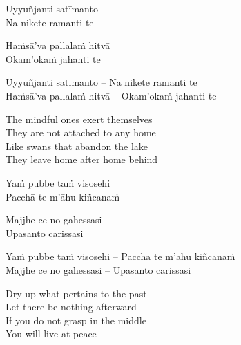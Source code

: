 \suttaRef{[Dhp 152]}

\ifninebythirteen

\clearpage

\begin{pali-hang-verses}
  Uyyuñjanti satīmanto\\
  Na nikete ramanti te
\end{pali-hang-verses}
\begin{pali-hang-together}
  Haṁsā'va pallalaṁ hitvā\\
  Okam'okaṁ jahanti te
\end{pali-hang-together}

\else

\begin{verses}
  Uyyuñjanti satīmanto – Na nikete ramanti te\\
  Haṁsā'va pallalaṁ hitvā – Okam'okaṁ jahanti te
\end{verses}

\fi

\begin{english-verses}
  The mindful ones exert themselves\\
  They are not attached to any home\\
  Like swans that abandon the lake\\
  They leave home after home behind
\end{english-verses}

\suttaRef{[Dhp 91]}

\ifbfive\clearpage\fi

\ifninebythirteen

\begin{pali-hang-verses}
  Yaṁ pubbe taṁ visosehi\\
  Pacchā te m'āhu kiñcanaṁ
\end{pali-hang-verses}
\begin{pali-hang-together}
  Majjhe ce no gahessasi\\
  Upasanto carissasi
\end{pali-hang-together}

\else

\begin{verses}
  Yaṁ pubbe taṁ visosehi – Pacchā te m'āhu kiñcanaṁ\\
  Majjhe ce no gahessasi – Upasanto carissasi
\end{verses}

\fi

\ifafive\clearpage\fi

\begin{english-verses}
  Dry up what pertains to the past\\
  Let there be nothing afterward\\
  If you do not grasp in the middle\\
  You will live at peace
\end{english-verses}

